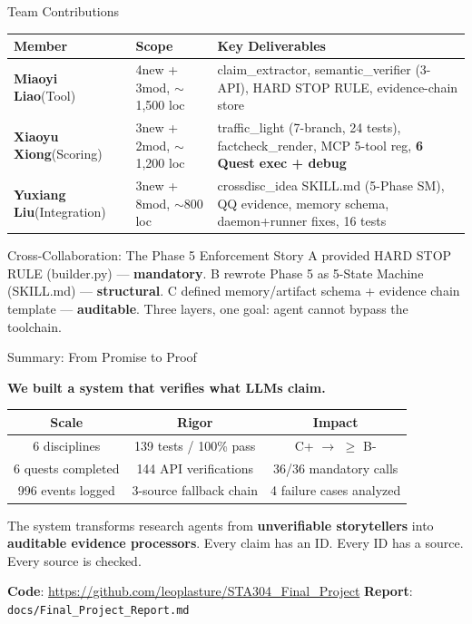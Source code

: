 \documentclass[aspectratio=169,11pt]{beamer}
\begin{document}
\begin{frame}{Team Contributions}
  \begin{table}[h]
    \footnotesize
    \begin{tabular}{lp{2cm}p{8cm}}
      \toprule
      Member & Scope & Key Deliverables \\
      \midrule
      \textbf{Miaoyi Liao}(Tool) & 4new + 3mod, $\sim$1,500 loc & claim\_extractor, semantic\_verifier (3-API), HARD STOP RULE, evidence-chain store \\
      \textbf{Xiaoyu Xiong}(Scoring) & 3new + 2mod, $\sim$1,200 loc & traffic\_light (7-branch, 24 tests), factcheck\_render, MCP 5-tool reg, \textbf{6 Quest exec + debug} \\
      \textbf{Yuxiang Liu}(Integration) & 3new + 8mod, $\sim$800 loc & crossdisc\_idea SKILL.md (5-Phase SM), QQ evidence, memory schema, daemon+runner fixes, 16 tests \\
      \bottomrule
    \end{tabular}
  \end{table}

  \begin{block}{Cross-Collaboration: The Phase 5 Enforcement Story}
    \footnotesize
    A provided HARD STOP RULE (builder.py) --- \textbf{mandatory}. B rewrote Phase 5 as 5-State Machine (SKILL.md) --- \textbf{structural}. C defined memory/artifact schema + evidence chain template --- \textbf{auditable}. Three layers, one goal: agent cannot bypass the toolchain.
  \end{block}
\end{frame}

\begin{frame}{Summary: From Promise to Proof}
  \begin{center}
    \Large
    \textbf{We built a system that verifies what LLMs claim.}

    \vspace{0.5cm}
    \normalsize
    \begin{tabular}{c|c|c}
      \textbf{Scale} & \textbf{Rigor} & \textbf{Impact} \\
      \hline
      6 disciplines & 139 tests / 100\% pass & C+ $\to$ $\ge$ B-\\
      6 quests completed & 144 API verifications & 36/36 mandatory calls\\
      996 events logged & 3-source fallback chain & 4 failure cases analyzed\\
    \end{tabular}

    \vspace{0.5cm}
    \normalsize
    The system transforms research agents from \textbf{unverifiable storytellers} into \textbf{auditable evidence processors}.
    Every claim has an ID. Every ID has a source. Every source is checked.

    \vspace{0.4cm}
    \small
    \textbf{Code}: \url{https://github.com/leoplasture/STA304\_Final\_Project} \quad
    \textbf{Report}: \texttt{docs/Final\_Project\_Report.md}
  \end{center}
\end{frame}
\end{document}
